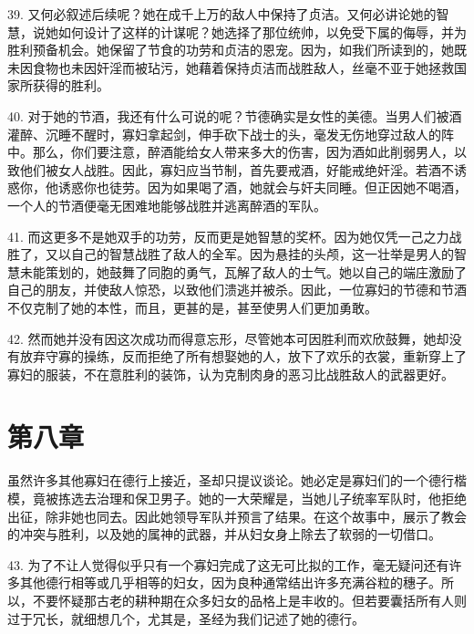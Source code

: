 39. 又何必叙述后续呢？她在成千上万的敌人中保持了贞洁。又何必讲论她的智慧，说她如何设计了这样的计谋呢？她选择了那位统帅，以免受下属的侮辱，并为胜利预备机会。她保留了节食的功劳和贞洁的恩宠。因为，如我们所读到的，她既未因食物也未因奸淫而被玷污，她藉着保持贞洁而战胜敌人，丝毫不亚于她拯救国家所获得的胜利。\par

40. 对于她的节酒，我还有什么可说的呢？节德确实是女性的美德。当男人们被酒灌醉、沉睡不醒时，寡妇拿起剑，伸手砍下战士的头，毫发无伤地穿过敌人的阵中。那么，你们要注意，醉酒能给女人带来多大的伤害，因为酒如此削弱男人，以致他们被女人战胜。因此，寡妇应当节制，首先要戒酒，好能戒绝奸淫。若酒不诱惑你，他诱惑你也徒劳。因为如果喝了酒，她就会与奸夫同睡。但正因她不喝酒，一个人的节酒便毫无困难地能够战胜并逃离醉酒的军队。\par

41. 而这更多不是她双手的功劳，反而更是她智慧的奖杯。因为她仅凭一己之力战胜了，又以自己的智慧战胜了敌人的全军。因为悬挂的头颅，这一壮举是男人的智慧未能策划的，她鼓舞了同胞的勇气，瓦解了敌人的士气。她以自己的端庄激励了自己的朋友，并使敌人惊恐，以致他们溃逃并被杀。因此，一位寡妇的节德和节酒不仅克制了她的本性，而且，更甚的是，甚至使男人们更加勇敢。\par

42. 然而她并没有因这次成功而得意忘形，尽管她本可因胜利而欢欣鼓舞，她却没有放弃守寡的操练，反而拒绝了所有想娶她的人，放下了欢乐的衣裳，重新穿上了寡妇的服装，不在意胜利的装饰，认为克制肉身的恶习比战胜敌人的武器更好。\par


\section{第八章}

虽然许多其他寡妇在德行上接近，圣却只提议谈论。她必定是寡妇们的一个德行楷模，竟被拣选去治理和保卫男子。她的一大荣耀是，当她儿子统率军队时，他拒绝出征，除非她也同去。因此她领导军队并预言了结果。在这个故事中，展示了教会的冲突与胜利，以及她的属神的武器，并从妇女身上除去了软弱的一切借口。\par

43. 为了不让人觉得似乎只有一个寡妇完成了这无可比拟的工作，毫无疑问还有许多其他德行相等或几乎相等的妇女，因为良种通常结出许多充满谷粒的穗子。所以，不要怀疑那古老的耕种期在众多妇女的品格上是丰收的。但若要囊括所有人则过于冗长，就细想几个，尤其是，圣经为我们记述了她的德行。\par

